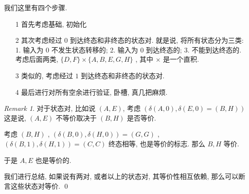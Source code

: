 \documentclass[12pt]{ctexart}
\theoremstyle{definition}
\theoremstyle{definition}
\theoremstyle{plain}
\theoremstyle{remark}
\newtheorem{remark}[definition]{Remark}
\begin{document}
我们这里有四个步骤. 

\begin{itemize}
\item [1] 首先考虑基础, 初始化 
\item [2] 其次考虑经过 \(0\) 到达终态和非终态的状态对. 
	就是说, 将所有状态分为三类: 1. 输入为 \(0\) 不发生状态转移的; 2. 输入为 \(0\) 到达终态的; 3. 不能到达终态的. 
	考虑后面两类,  \(\{ D , F \} \times \{ A, B , E , G , H \}\) , 其中 \(\times\) 是一个直积. 
\item [3] 类似的, 考虑经过 \(1\) 到达终态和非终态的状态对. 
\item [4] 最后进行对所有空余进行验证, 卧槽, 真几把麻烦.
\end{itemize}

\begin{remark}
	对于状态对, 比如说 \((A , E)\), 考虑 \((\delta (A , 0) ,\delta (E, 0 ) = ( B , H) )\) 这是说, \( (A, E ) \) 不等价取决于 \((B, H) \) 是否等价. 

	考虑 \(( B,  H ) \) , \((\delta (B , 0 ) ,\delta (H , 0 ) ) = (G , G) \) , \( (\delta (B , 1 )  ,\delta (H , 1 ) ) = (C, C)\)
	终态相等, 也是等价的标志. 那么 \(B, H\) 等价. 

	于是 \(A, E\) 也是等价的. 

	我们进行总结, 如果说有两对, 或者以上的状态对, 其等价性相互依赖, 那么可以断言这些状态对等价.  \qed
\end{remark}
\end{document}

